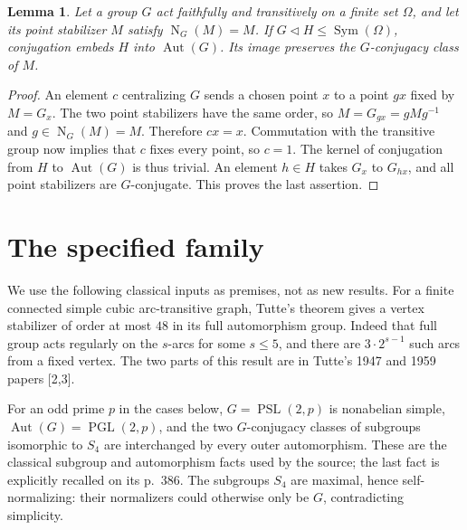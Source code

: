 \documentclass[11pt]{article}
\newtheorem{lemma}{Lemma}
\newcommand{\PSL}{\operatorname{PSL}}
\newcommand{\PGL}{\operatorname{PGL}}
\newcommand{\Aut}{\operatorname{Aut}}
\newcommand{\N}{\operatorname{N}}
\begin{document}
\begin{lemma}\label{normalizer}
Let a group $G$ act faithfully and transitively on a finite set $\Omega$,
and let its point stabilizer $M$ satisfy $\N_G(M)=M$.
If $G\triangleleft H\le\operatorname{Sym}(\Omega)$, conjugation
embeds $H$ into $\Aut(G)$. Its image preserves the $G$-conjugacy class
of $M$.
\end{lemma}
\begin{proof}
An element $c$ centralizing $G$ sends a chosen point $x$ to a point
$gx$ fixed by $M=G_x$. The two point stabilizers have the same order,
so $M=G_{gx}=gMg^{-1}$ and $g\in\N_G(M)=M$. Therefore $cx=x$.
Commutation with the transitive group now implies that $c$ fixes every
point, so $c=1$. The kernel of conjugation from $H$ to $\Aut(G)$ is
thus trivial. An element $h\in H$ takes $G_x$ to $G_{hx}$, and all
point stabilizers are $G$-conjugate. This proves the last assertion.
\end{proof}

\section{The specified family}
We use the following classical inputs as premises, not as new results.
For a finite connected simple cubic arc-transitive graph, Tutte's
theorem gives a vertex stabilizer of order at most $48$ in its full
automorphism group. Indeed that full group acts regularly on the
$s$-arcs for some $s\le5$, and there are $3\cdot2^{s-1}$ such arcs
from a fixed vertex. The two parts of this result are in
Tutte's 1947 and 1959 papers [2,3].

For an odd prime $p$ in the cases below,
$G=\PSL(2,p)$ is nonabelian simple,
$\Aut(G)=\PGL(2,p)$, and the two $G$-conjugacy classes of
subgroups isomorphic to $S_4$ are interchanged by every outer
automorphism. These are the classical subgroup and automorphism
facts used by the source; the last fact is explicitly recalled on
its p.~386. The subgroups $S_4$ are maximal, hence self-normalizing:
their normalizers could otherwise only be $G$, contradicting simplicity.
\end{document}
